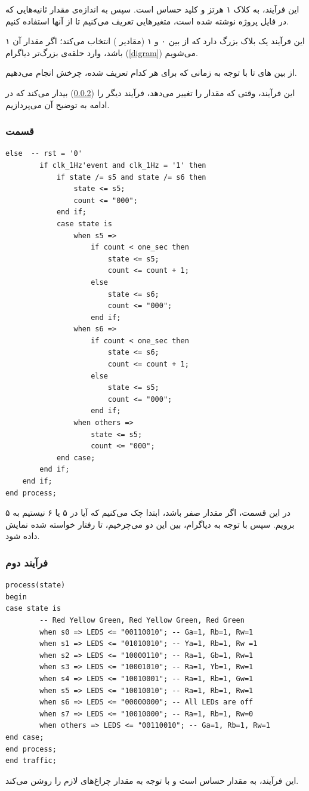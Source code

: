\documentclass[dvipsnames, svgnames, x11names, a4paper, 11pt]{article}
\begin{document}
این فرآیند، به کلاک ۱ هرتز و کلید  حساس است. سپس به اندازه‌ی مقدار ثانیه‌هایی که در فایل پروژه نوشته شده است، متغیر‌هایی تعریف می‌کنیم تا از آنها استفاده کنیم.

این فرآیند یک بلاک  بزرگ دارد که از بین ۰ و ۱ (مقادیر ) انتخاب می‌کند؛ اگر مقدار آن ۱ باشد، وارد حلقه‌ی بزرگ‌‌تر دیاگرام (\ref{digram}) می‌شویم.

از بین 
های
تا
با توجه به زمانی که برای هر کدام تعریف شده، چرخش انجام می‌دهیم.

این فرآیند، وقتی که مقدار 
را تغییر می‌دهد، فرآیند دیگر را (\ref{second-process}) بیدار می‌کند که در ادامه به توضیح آن می‌پردازیم.

\newpage
\subsubsection{قسمت }
\begin{latin}
\begin{lstlisting}[firstnumber=101]
    else  -- rst = '0'
        if clk_1Hz'event and clk_1Hz = '1' then
			if state /= s5 and state /= s6 then
				state <= s5;
				count <= "000";
			end if;
			case state is
				when s5 =>
					if count < one_sec then
						state <= s5;
						count <= count + 1;
					else
						state <= s6;
						count <= "000";
					end if;
				when s6 =>
					if count < one_sec then
						state <= s6;
						count <= count + 1;
					else
						state <= s5;
						count <= "000";
					end if;
				when others =>
					state <= s5;
					count <= "000";
            end case;
        end if;
    end if;
end process;
\end{lstlisting}
\end{latin}

در این قسمت، اگر مقدار  صفر باشد، ابتدا چک می‌کنیم که آیا در 
۵
 یا ۶ نیستیم به 
۵ برویم. سپس با توجه به دیاگرام، بین این دو 
می‌چرخیم، تا رفتار خواسته شده نمایش داده شود.

\newpage
\subsubsection{فرآیند دوم}
\label{second-process}
\begin{latin}
\begin{lstlisting}[firstnumber=131]
process(state)
begin
case state is
		-- Red Yellow Green, Red Yellow Green, Red Green
		when s0 => LEDS <= "00110010"; -- Ga=1, Rb=1, Rw=1
		when s1 => LEDS <= "01010010"; -- Ya=1, Rb=1, Rw =1
		when s2 => LEDS <= "10000110"; -- Ra=1, Gb=1, Rw=1
		when s3 => LEDS <= "10001010"; -- Ra=1, Yb=1, Rw=1
		when s4 => LEDS <= "10010001"; -- Ra=1, Rb=1, Gw=1
		when s5 => LEDS <= "10010010"; -- Ra=1, Rb=1, Rw=1
		when s6 => LEDS <= "00000000"; -- All LEDs are off
        when s7 => LEDS <= "10010000"; -- Ra=1, Rb=1, Rw=0
		when others => LEDS <= "00110010"; -- Ga=1, Rb=1, Rw=1
end case;
end process;
end traffic;
\end{lstlisting}
\end{latin}

این فرآیند، به مقدار 
حساس است و با توجه به مقدار 
چراغ‌های لازم را روشن می‌کند.
\end{document}
